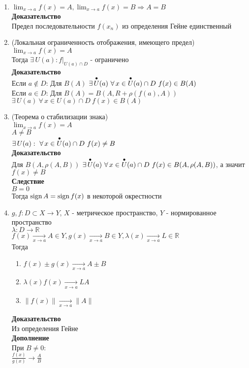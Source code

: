 \documentclass[12pt]{article}
\begin{document}
\begin{enumerate}
    \item $\lim_{x\rightarrow a} f(x) = A, \lim_{x\rightarrow a} f(x) = B \Rightarrow A = B$\\
    \textbf{Доказательство}\\
    Предел последовательности $f(x_n)$ из определения Гейне единственный
    \item (Локальная ограниченность отображения, имеющего предел)\\
    $\lim_{x\rightarrow a} f(x) = A$\\
    Тогда $\exists\,U(a): f|_{U(a)\cap D}$ - ограничено\\
    \textbf{Доказательство}\\
    Если $a \notin D$: Для $B(A)$ $\exists\,\overset{\bullet}{U}(a)\ \forall\,x\in \overset{\bullet}{U}(a)\cap D\ f(x)\in B(A)$\\
    Если $a \in D$: Для $B(A) = B(A,R+\rho(f(a),A))$ $\exists\,U(a)\ \forall\,x\in U(a)\cap D\ f(x)\in B(A)$
    \item (Теорема о стабилизации знака)\\
    $\lim_{x\rightarrow a} f(x) = A$\\
    $A \neq B$\\
    $\exists\,U(a):\ \forall\,x\in \overset{\bullet}{U}(a)\cap D\ f(x) \neq B$\\
    \textbf{Доказательство}\\
    Для $B(A, \rho(A,B))$ $\exists\,\overset{\bullet}{U}(a)\ \forall\,x\in \overset{\bullet}{U}(a)\cap D\ f(x)\in B(A,\rho(A,B))$, а значит $f(x) \neq B$\\
    \textbf{Следствие}\\
    $B = 0$\\
    Тогда $\operatorname{sign} A = \operatorname{sign} f(x)$ в некоторой окрестности
    \item $g,f:D\subset X \rightarrow Y$, $X$ - метрическое пространство, $Y$ - нормированное пространство\\
    $\lambda: D \rightarrow \mathbb{R}$\\
    $f(x) \xrightarrow[x\rightarrow a]{} A \in Y, g(x) \xrightarrow[x\rightarrow a]{} B\in Y, \lambda(x) \xrightarrow[x\rightarrow a]{} L\in \mathbb{R}$\\
    Тогда
    \begin{enumerate}
        \item $f(x)\pm g(x)\xrightarrow[x\rightarrow a]{} A\pm B$
        \item $\lambda(x)f(x)\xrightarrow[x\rightarrow a]{} LA$
        \item $\|f(x)\|\xrightarrow[x\rightarrow a]{} \|A\|$
    \end{enumerate}
    \textbf{Доказательство}\\
    Из определения Гейне\\
    \textbf{Дополнение}\\
    При $B \neq 0$:\\
    $\frac {f(x)}{g(x)} \rightarrow \frac AB$
\end{enumerate}
\end{document}
